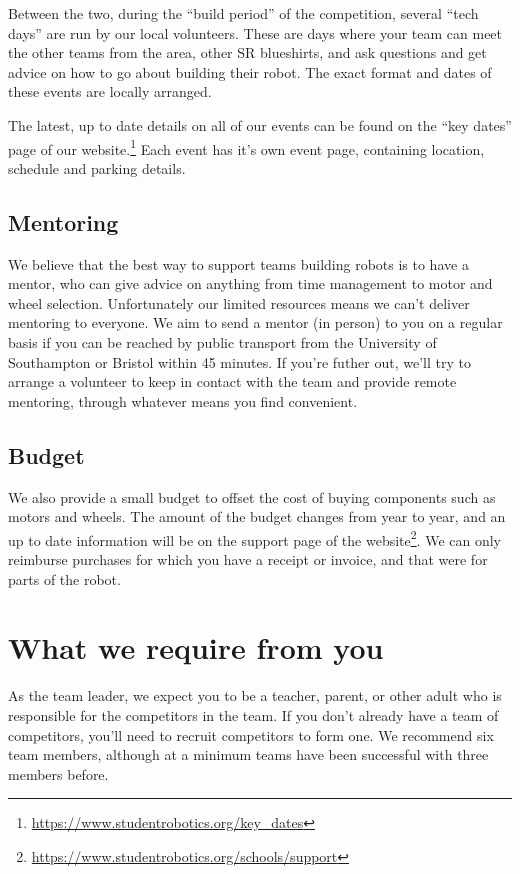 \documentclass[a4paper]{article}
\begin{document}
Between the two, during the ``build period'' of the competition, several ``tech
days'' are run by our local volunteers.  These are days where your team can
meet the other teams from the area, other SR blueshirts, and ask questions and
get advice on how to go about building their robot. The exact format and dates
of these events are locally arranged.

The latest, up to date details on all of our events can be found on the ``key
dates'' page of our
website.\footnote{\url{https://www.studentrobotics.org/key_dates}} Each event
has it's own event page, containing location, schedule and parking details.

\subsection*{Mentoring}

We believe that the best way to support teams building robots is to have a
mentor, who can give advice on anything from time management to motor and wheel
selection. Unfortunately our limited resources means we can't deliver mentoring
to everyone. We aim to send a mentor (in person) to you on a regular basis if
you can be reached by public transport from the University of Southampton or
Bristol within 45 minutes. If you're futher out, we'll try to arrange a
volunteer to keep in contact with the team and provide remote mentoring,
through whatever means you find convenient.

\subsection*{Budget}

We also provide a small budget to offset the cost of buying components such as
motors and wheels. The amount of the budget changes from year to year, and an
up to date information will be on the support page of the
website\footnote{\url{https://www.studentrobotics.org/schools/support}}. We
can only reimburse purchases for which you have a receipt or invoice, and that
were for parts of the robot.

\section*{What we require from you}

As the team leader, we expect you to be a teacher, parent, or other adult who
is responsible for the competitors in the team. If you don't already have a
team of competitors, you'll need to recruit competitors to form one. We
recommend six team members, although at a minimum teams have been successful
with three members before.
\end{document}
